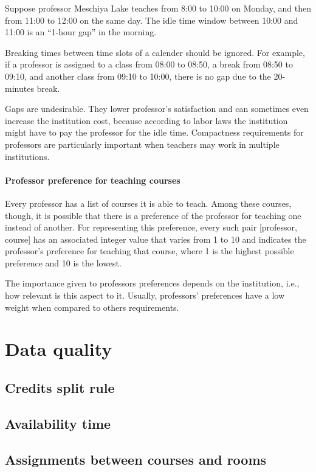 Suppose professor Meschiya Lake teaches from 8:00 to 10:00 on Monday, and then from 11:00 to 12:00 on the same day. The idle time window between 10:00 and 11:00 is an ``1-hour gap'' in the morning.

Breaking times between time slots of a calender should be ignored. For example, if a professor is assigned to a class from 08:00 to 08:50, a break from 08:50 to 09:10, and another class from 09:10 to 10:00, there is no gap due to the 20-minutes break.

Gaps are undesirable. They lower professor's satisfaction and can sometimes even increase the institution cost, because according to labor laws the institution might have to pay the professor for the idle time. Compactness requirements for professors are particularly important when teachers may work in multiple institutions.



\paragraph{Professor preference for teaching courses}
\label{constrprefercourse}

Every professor has a list of courses it is able to teach. Among these courses, though, it is possible that there is a preference of the professor for teaching one instead of another. For representing this preference, every such pair [professor, course] has an associated integer value that varies from 1 to 10 and indicates the professor's preference for teaching that course, where 1 is the highest possible preference and 10 is the lowest.

The importance given to professors preferences depends on the institution, i.e., how relevant is this aspect to it. Usually, professors' preferences have a low weight when compared to others requirements.



\section{Data quality}

\subsection{Credits split rule}

\subsection{Availability time}


\subsection{Assignments between courses and rooms}




